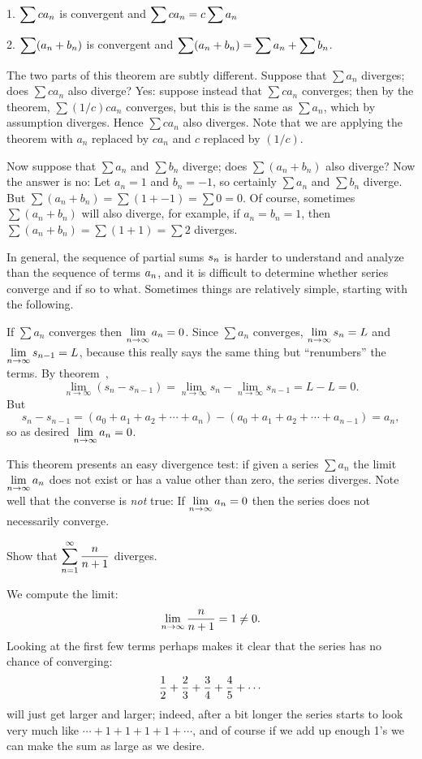\beginlist
\item{1.} $\displaystyle\sum ca_n$ is convergent and $\displaystyle\sum ca_n=c\sum a_n$
\item{2.} $\displaystyle\sum (a_n+b_n)$ is convergent and 
$\displaystyle\sum (a_n+b_n)=\sum a_n+\sum b_n$.
\endlist
\endthmnoproof

The two parts of this theorem are subtly different. Suppose that
$\sum a_n$ diverges; does $\sum ca_n$ also diverge? Yes: suppose
instead that $\sum ca_n$ converges; then by the theorem,
$\sum (1/c)ca_n$ converges, but this is the same as $\sum a_n$,
which by assumption diverges. Hence $\sum ca_n$ also diverges. Note
that we are applying the theorem with $a_n$ replaced by $ca_n$ and $c$
replaced by $(1/c)$.

Now suppose that $\sum a_n$ and $\sum b_n$ diverge; does
$\sum (a_n+b_n)$ also diverge? Now the answer is no: Let $a_n=1$ and
$b_n=-1$, so certainly $\sum a_n$ and $\sum b_n$ diverge. But
$\sum (a_n+b_n)=\sum(1+-1)=\sum 0 = 0$. Of course, sometimes 
$\sum (a_n+b_n)$ will also diverge, for example, if $a_n=b_n=1$, then
$\sum (a_n+b_n)=\sum(1+1)=\sum 2$ diverges.

In general, the sequence of partial sums $\displaystyle s_n$ is harder to understand
and analyze than the sequence of terms $\displaystyle a_n$, and it is difficult
to determine whether series converge and if so to what. Sometimes
things are relatively simple, starting with the following.

\thm \relax{}
If $\sum a_n$ converges then $\displaystyle\lim_{n\to\infty}a_n=0$.
\endthm
\proof Since $\sum a_n$ converges, $\displaystyle\lim_{n\to\infty}s_n=L$ and 
$\displaystyle\lim_{n\to\infty}s_{n-1}=L$, because this really says the same
thing but ``renumbers'' the terms. By
theorem~, 
$$
  \lim_{n\to\infty} (s_{n}-s_{n-1})=
  \lim_{n\to\infty} s_{n}-\lim_{n\to\infty}s_{n-1}=L-L=0.
$$
But
$$
  s_{n}-s_{n-1}=(a_0+a_1+a_2+\cdots+a_n)-(a_0+a_1+a_2+\cdots+a_{n-1})
  =a_n,
$$
so as desired $\displaystyle\lim_{n\to\infty}a_n=0$.
\endproof

This theorem presents an easy divergence 
test: if given a series $\sum
a_n$ the limit $\displaystyle\lim_{n\to\infty}a_n$ does not exist or has a value
other than zero, the series diverges. Note well that the converse is
{\em not\/} true: If $\displaystyle\lim_{n\to\infty}a_n=0$ then the series does
not necessarily converge.

\example
Show that $\displaystyle\sum_{n=1}^\infty {n\over n+1}$ diverges.
\par\nobreak\ssk\noindent
We compute the limit:
$$\lim _{n\to\infty}{n\over n+1}=1\not=0.$$
Looking at the first few terms perhaps makes it clear that the series
has no chance of converging:
$${1\over2}+{2\over3}+{3\over4}+{4\over5}+\cdots$$
will just get larger and larger; indeed, after a bit longer the series
starts to look very much like $\cdots+1+1+1+1+\cdots$, and of course
if we add up enough 1's we can make the sum as large as we desire.
\endexample

